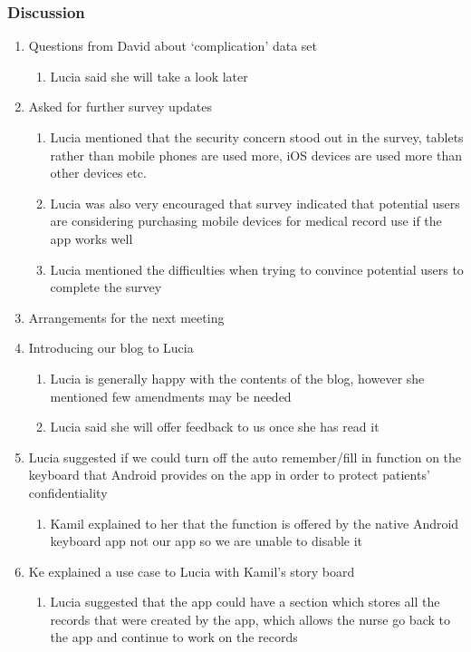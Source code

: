 \documentclass[12pt,a4paper,oneside,titlepage]{article}
\begin{document}
\subsubsection{Discussion}
\begin{enumerate}
	\item Questions from David about ‘complication’ data set 
	\begin{enumerate}
		\item Lucia said she will take a look later 
	\end{enumerate}
	\item Asked for further survey updates 
	\begin{enumerate}
		\item Lucia mentioned that the security concern stood out in the survey, tablets rather than mobile phones are used more, iOS devices are used more than other devices etc. 
		\item Lucia was also very encouraged that survey indicated that potential users are considering purchasing mobile devices for medical record use if the app works well 
		\item Lucia mentioned the difficulties when trying to convince potential users to complete the survey 
	\end{enumerate}
	\item Arrangements for the next meeting 
	\item Introducing our blog to Lucia 
	\begin{enumerate}
		\item Lucia is generally happy with the contents of the blog, however she mentioned few amendments may be needed 
		\item Lucia said she will offer feedback to us once she has read it 
	\end{enumerate}
	\item Lucia suggested if we could turn off the auto remember/fill in function on the keyboard that Android provides on the app in order to protect patients’ confidentiality 
	\begin{enumerate}
		\item Kamil explained to her that the function is offered by the native Android keyboard app not our app so we are unable to disable it
\end{enumerate}		
	\item Ke explained a use case to Lucia with Kamil's story board 
	\begin{enumerate}
		\item Lucia suggested that the app could have a section which stores all the records that were created by the app, which allows the nurse go back to the app and continue to work on the records 

\end{enumerate}
\end{enumerate}
\end{document}
